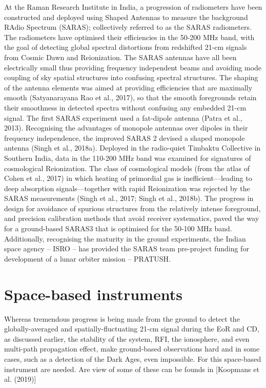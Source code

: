 At the Raman Research Institute in India, a progression of radiometers have been constructed and deployed using Shaped Antennas to measure the background RAdio Spectrum (SARAS); collectively referred to as the SARAS radiometers.  The radiometers have optimised their efficiencies in the 50-200 MHz band, with the goal of detecting global spectral distortions from redshifted 21-cm signals from Cosmic Dawn and Reionization. The SARAS antennas have all been electrically small thus providing frequency independent beams and avoiding mode coupling of sky spatial structures into confusing spectral structures.  The shaping of the antenna elements was aimed at providing efficiencies that are maximally smooth (Satyanarayana Rao et al., 2017), so that the smooth foregrounds retain their smoothness in detected spectra without confusing any embedded 21-cm signal. The first SARAS experiment used a fat-dipole antenna (Patra et al., 2013).  Recognising the advantages of monopole antennas over dipoles in their frequency independence, the improved SARAS 2 devised a shaped monopole antenna (Singh et al., 2018a).  Deployed in the radio-quiet Timbaktu Collective in Southern India, data in the 110-200 MHz band was examined for signatures of cosmological Reionization.  The class of cosmological models (from the atlas of Cohen et al., 2017) in which heating of primordial gas is inefficient---leading to deep absorption signals---together with rapid Reionization was rejected by the SARAS measurements (Singh et al., 2017; Singh et al., 2018b). The progress in design for avoidance of spurious structures from the relatively intense foreground, and precision calibration methods that avoid receiver systematics, paved the way for a ground-based SARAS3 that is optimised for the 50-100 MHz band.  Additionally, recognising the maturity in the ground experiments, the Indian space agency – ISRO – has provided the SARAS team pre-project funding for development of a lunar orbiter mission – PRATUSH.




\section{Space-based instruments}

Whereas tremendous progress is being made from the ground to detect the globally-averaged and spatially-fluctuating 21-cm signal during the EoR and CD, as discussed earlier, the stability of the system, RFI, the ionosphere, and even multi-path propagation effect, make ground-based observations hard and in some cases, such as a detection of the Dark Ages, even impossible. For this space-based instrument are needed. Are view of some of these can be founds in [Koopmans et al. (2019)]

